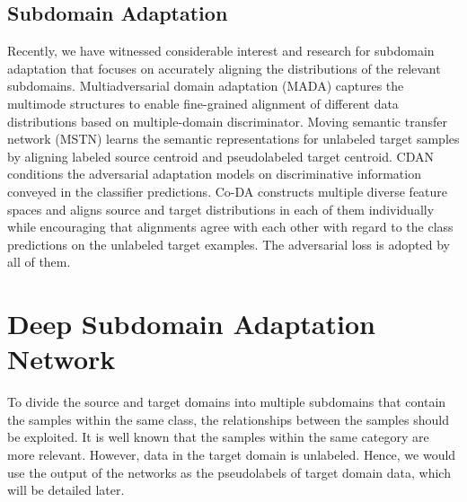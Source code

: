 \documentclass[conference]{IEEEtran}
\begin{document}
\subsection{Subdomain Adaptation} 
Recently, we have witnessed considerable interest and research for subdomain adaptation that focuses on accurately aligning the distributions of the relevant subdomains.
Multiadversarial domain adaptation (MADA) captures the multimode structures to enable fine-grained alignment of different data distributions based on multiple-domain discriminator.
Moving semantic transfer network (MSTN) learns the semantic representations for unlabeled target samples by aligning labeled source centroid and pseudolabeled target centroid.
CDAN conditions the adversarial adaptation models on discriminative information conveyed in the classifier predictions.
Co-DA constructs multiple diverse feature spaces and aligns source and target distributions in each of them individually while encouraging that alignments agree with each other with regard to the class predictions on the unlabeled target examples.
The adversarial loss is adopted by all of them. 

\section{Deep Subdomain Adaptation Network}
To divide the source and target domains into multiple subdomains that contain the samples within the same class,
the relationships between the samples should be exploited. 
It is well known that the samples within the same category are more relevant.
However, data in the target domain is unlabeled. Hence, we would use the output of the networks as the pseudolabels of target domain data, which will be detailed later.




\end{document}
